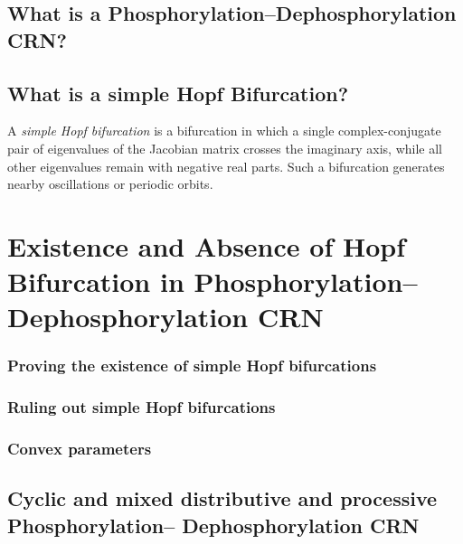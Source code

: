 \section{What is a Phosphorylation–Dephosphorylation CRN?}

\section{What is a simple Hopf Bifurcation?}
A \textit{simple Hopf bifurcation} is a bifurcation in which a single complex-conjugate pair of eigenvalues of the Jacobian matrix crosses the imaginary axis, while all other eigenvalues remain with negative real parts. Such a bifurcation generates nearby oscillations or periodic orbits.

\chapter{Existence and Absence of Hopf Bifurcation in Phosphorylation–Dephosphorylation CRN}

\subsection{Proving the existence of simple Hopf bifurcations}

\subsection{Ruling out simple Hopf bifurcations}

\subsection{Convex parameters}

\section{Cyclic and mixed distributive and processive Phosphorylation– \newline
  Dephosphorylation CRN}


